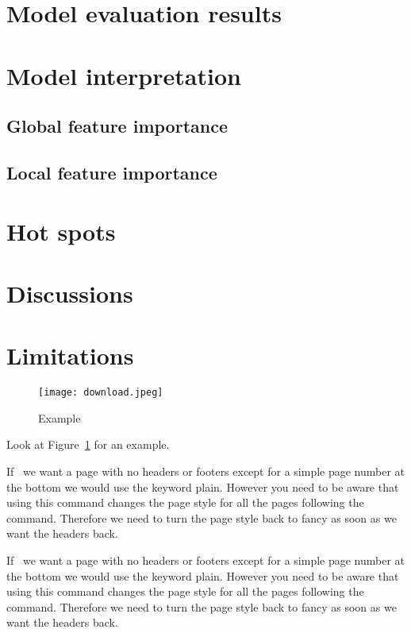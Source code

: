 \pagebreak
\section{Model evaluation results}
\section{Model interpretation}
\subsection{Global feature importance}
\subsection{Local feature importance}

\section{Hot spots}

\section{Discussions}

\section{Limitations}


\begin{figure}[h]
    \centering
    \texttt{[image: download.jpeg]}
    \caption{Example}
    \label{fig:results}
\end{figure}

Look at Figure~\ref{fig:results} for an example.

If~\cite{caselloTransportationActivityCenters2006} we want a page with no headers or footers except for a simple page number at the bottom we would use the keyword plain. However you need to be aware that using this command changes the page style for all the pages following the command. Therefore we need to turn the page style back to fancy as soon as we want the headers back.

If~\citep{caselloTransportationActivityCenters2006} we want a page with no headers or footers except for a simple page number at the bottom we would use the keyword plain. However you need to be aware that using this command changes the page style for all the pages following the command. Therefore we need to turn the page style back to fancy as soon as we want the headers back.

